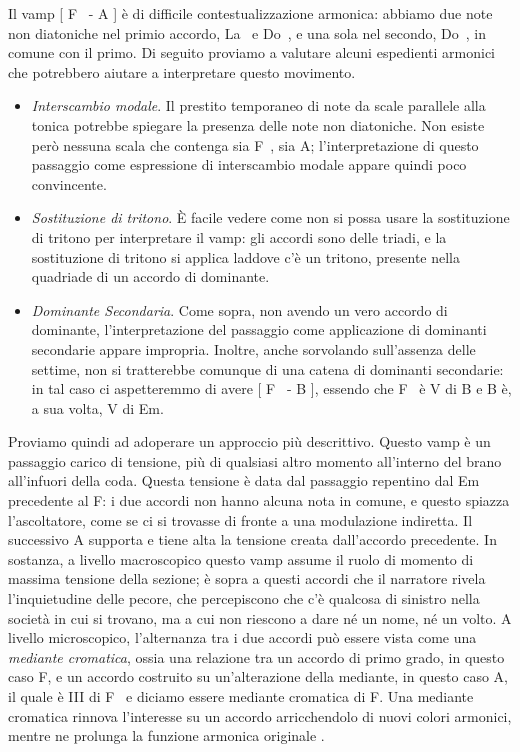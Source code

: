 \documentclass[class=book, crop=false, oneside, 12pt]{standalone}
\begin{document}
    Il vamp [ F\sharp~ - A ] è  di difficile contestualizzazione armonica: abbiamo due note non diatoniche nel primio accordo, La\sharp~ e Do\sharp~, e una sola nel secondo, Do\sharp~, in comune con il primo. Di seguito proviamo a valutare alcuni espedienti armonici che potrebbero aiutare a interpretare questo movimento.
    \begin{itemize}
        \item \emph{Interscambio modale}. Il prestito temporaneo di note da scale parallele alla tonica potrebbe spiegare la presenza delle note non diatoniche. Non esiste però nessuna scala che contenga sia F\sharp~, sia A; l'interpretazione di questo passaggio come espressione di interscambio modale appare quindi poco convincente.
        \item \emph{Sostituzione di tritono}. È facile vedere come non si possa usare la sostituzione di tritono per interpretare il vamp: gli accordi sono delle triadi, e la sostituzione di tritono si applica laddove c'è un tritono, presente nella quadriade di un accordo di dominante.
        \item \emph{Dominante Secondaria}. Come sopra, non avendo un vero accordo di dominante, l'interpretazione del passaggio come applicazione di dominanti secondarie appare impropria. Inoltre, anche sorvolando sull'assenza delle settime, non si tratterebbe comunque di una catena di dominanti secondarie: in tal caso ci aspetteremmo di avere [ F\sharp~ - B ], essendo che F\sharp~ è V di B e B è, a sua volta, V di Em.
    \end{itemize}
    
    Proviamo quindi ad adoperare un approccio più descrittivo. Questo vamp è un passaggio carico di tensione, più di qualsiasi altro momento all'interno del brano all'infuori della coda. Questa tensione è data dal passaggio repentino dal Em precedente al F\sharp : i due accordi non hanno alcuna nota in comune, e questo spiazza l'ascoltatore, come se ci si trovasse di fronte a una modulazione indiretta. Il successivo A supporta e tiene alta la tensione creata dall'accordo precedente. In sostanza, a livello macroscopico questo vamp assume il ruolo di momento di massima tensione della sezione; è sopra a questi accordi che il narratore rivela l'inquietudine delle pecore, che percepiscono che c'è qualcosa di sinistro nella società in cui si trovano, ma a cui non riescono a dare né un nome, né un volto. A livello microscopico, l'alternanza tra i due accordi può essere vista come una \emph{mediante cromatica}, ossia una relazione tra un accordo di primo grado, in questo caso F\sharp, e un accordo costruito su un'alterazione della mediante,  in questo caso A, il quale è \flat III di F\sharp~ e diciamo essere mediante cromatica di F\sharp. Una mediante cromatica rinnova l'interesse su un accordo arricchendolo di nuovi colori armonici, mentre ne prolunga la funzione armonica originale \cite[p. 202]{benward2014music}.
\end{document}
